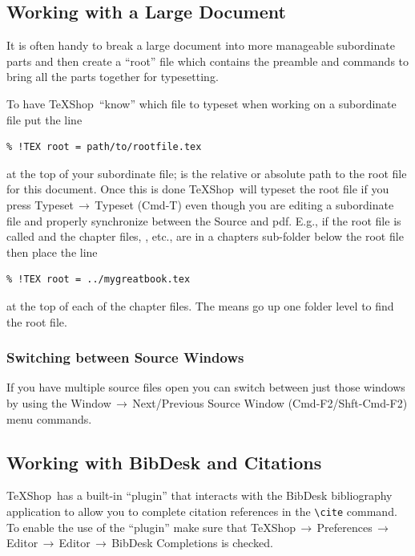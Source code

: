 \documentclass[letterpaper,11pt]{article}
\newcommand{\TS}{\textsf{\TeX Shop}}
\newcommand{\acr}[1]{\textsf{#1}}
\newcommand{\cmd}[1]{\textsf{#1}}
\newcommand{\mnu}[1]{\textsf{#1}}
\newcommand{\To}{\,\(\to\)\,}
\begin{document}
\subsection{Working with a Large Document}\label{sec:root}

It is often handy to break a large document into more manageable subordinate parts and then create a ``root'' file which contains the preamble and \verb|| commands to bring all the parts together for typesetting.

To have \TS\ ``know'' which file to typeset when working on a subordinate file put the line
\begin{verbatim}
% !TEX root = path/to/rootfile.tex
\end{verbatim}
at the top of your subordinate file;  is the relative or absolute path to the root file for this document. Once this is done \TS\ will typeset the root file if you press \mnu{Typeset}\To\mnu{Typeset} (\cmd{Cmd-T}) even though you are editing a subordinate file and properly synchronize between the Source and \acr{pdf}. E.g., if the root file is called  and the chapter files, , etc., are in a \cmd{chapters} sub-folder below the root file then place the line
\begin{verbatim}
% !TEX root = ../mygreatbook.tex
\end{verbatim}
at the top of each of the chapter files. The  means go up one folder level to find the root file.

\subsubsection{Switching between Source Windows}

If you have multiple source files open you can switch between just those windows by using the \mnu{Window}\To\mnu{Next/Previous Source Window} (\cmd{Cmd-F2}/\cmd{Shft-Cmd-F2}) menu commands.

\subsection{Working with \cmd{BibDesk} and Citations}

\TS\ has a built-in ``plugin'' that interacts with the \cmd{BibDesk} bibliography application to allow you to complete citation references in the \verb|\cite| command.  To enable the use of the ``plugin'' make sure that \mnu{TeXShop}\To\mnu{Preferences}\To\mnu{Editor}\To\mnu{Editor}\To\mnu{BibDesk Completions} is checked. 
\end{document}
